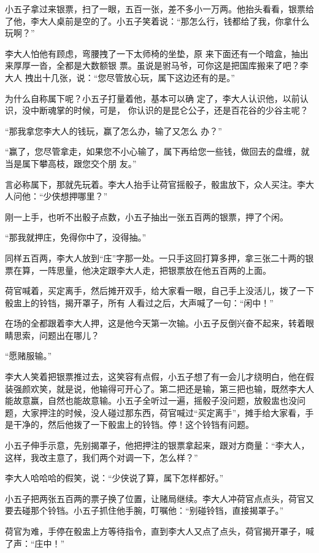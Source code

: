 小五子拿过来银票，扫了一眼，五百一张，差不多小一万两。他抬头看看，银票给了他，李大人桌前是空的了。小五子笑着说：“那怎么行，钱都给了我，你拿什么玩啊？”

李大人怕他有顾虑，弯腰拽了一下太师椅的坐垫，原
来下面还有一个暗盒，抽出来厚厚一沓，全都是大数额银
票。虽说是驸马爷，可你这是把国库搬来了吧？李大人
拽出十几张，说：“您尽管放心玩，属下这边还有的是。”

为什么自称属下呢？小五子打量着他，基本可以确
定了，李大人认识他，以前认识，没中断魂掌的时候，可是，
你认识的是昆仑公子，还是百花谷的少谷主呢？

“那我拿您李大人的钱玩，赢了怎么办，输了又怎么
办？”

“赢了，您尽管拿走，如果您不小心输了，属下再给您一些钱，做回去的盘缠，就当是属下攀高枝，跟您交个朋
友。”

言必称属下，那就先玩着。李大人抬手让荷官摇骰子，骰盅放下，众人买注。李大人问他：“少侠想押哪里？”

刚一上手，也听不出骰子点数，小五子抽出一张五百两的银票，押了个闲。

“那我就押庄，免得你中了，没得抽。”

同样五百两，李大人放到“庄”字那一处。一只手这回打算多押，拿三张二十两的银票在算，一阵思量，他决定跟李大人走，把银票放在他五百两的上面。

荷官喊着，买定离手，然后摊开双手，给大家看一眼，自己手上没活儿，拨了一下骰盅上的铃铛，揭开罩子，所有
人看过之后，大声喊了一句：“闲中！”

在场的全都跟着李大人押，这是他今天第一次输。小五子反倒兴奋不起来，转着眼睛思索，问题出在哪儿？

“愿赌服输。”

李大人笑着把银票推过去，这笑容有点假，小五子想了有一会儿才绕明白，他在假装强颜欢笑，就是说，他输得可开心了。第二把还是输，第三把也输，既然李大人能故意赢，自然也能故意输。小五子全听过一遍，摇骰子没问题，放骰盅也没问题，大家押注的时候，没人碰过那东西，荷官喊过“买定离手”，摊手给大家看，手是干净的，然后他拨了一下骰盅上的铃铛。停！这个铃铛有问题。

小五子伸手示意，先别揭罩子，他把押注的银票拿起来，跟对方商量：“李大人，这样，我改主意了，我们两个对调一下，怎么样？”

李大人哈哈哈的假笑，说：“少侠说了算，属下怎样都好。”

小五子把两张五百两的票子换了位置，让赌局继续。李大人冲荷官点点头，荷官又要去碰那个铃铛。小五子抓住他手腕，叮嘱他：“别碰铃铛，直接揭罩子。”

荷官为难，手停在骰盅上方等待指令，直到李大人又点了点头，荷官揭开罩子，喊了声：“庄中！”

